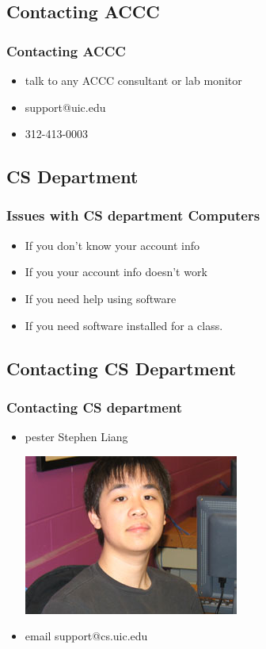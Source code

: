 \documentclass[hyperref={pdfpagelabels=false}]{beamer}
\begin{document}
\subsection{Contacting ACCC}
\frame
{
    \frametitle{Contacting ACCC}
    \begin{itemize}
    \item{talk to any ACCC consultant or lab monitor}
    \item{support@uic.edu}
    \item{312-413-0003}
    \end{itemize}
}
\subsection{CS Department}
\frame
{
    \frametitle{Issues with CS department Computers}
    \begin{itemize}
    \item{If you don't know your account info}
    \item{If you your account info doesn't work}
    \item{If you need help using software}
    \item{If you need software installed for a class.}
    \end{itemize}
}
\subsection{Contacting CS Department}
\frame
{
    \frametitle{Contacting CS department}
    \begin{itemize}
    \item{pester Stephen Liang}

    \includegraphics[totalheight=0.3\textheight]{sliang6.jpg}
    \item{email support@cs.uic.edu}
    \end{itemize}
}
\end{document}
